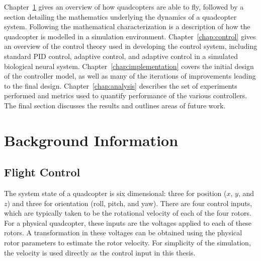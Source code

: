 \documentclass[letterpaper,12pt,titlepage,oneside,final]{book}
\newcommand{\Chapref}[1]{Chapter~\ref{#1}}
\begin{document}
\Chapref{chap:background} gives an overview of how quadcopters are able to fly, followed by a section detailing the mathematics underlying the dynamics of a quadcopter system. 
Following the mathematical characterization is a description of how the quadcopter is modelled in a simulation environment.
\Chapref{chap:control} gives an overview of the control theory used in developing the control system, including standard PID control, adaptive control, and adaptive control in a simulated biological neural system. 
\Chapref{chap:implementation} covers the initial design of the controller model, as well as many of the iterations of improvements leading to the final design.
\Chapref{chap:analysis} describes the set of experiments performed and metrics used to quantify performance of the various controllers. 
The final section discusses the results and outlines areas of future work.

\chapter{Background Information} \label{chap:background}

\section{Flight Control}


The system state of a quadcopter is six dimensional: three for position ($x$, $y$, and $z$) and three for orientation (roll, pitch, and yaw). 
There are four control inputs, which are typically taken to be the rotational velocity of each of the four rotors. 
For a physical quadcopter, these inputs are the voltages applied to each of these rotors.
A transformation in these voltages can be obtained using the physical rotor parameters to estimate the rotor velocity.
For simplicity of the simulation, the velocity is used directly as the control input in this thesis. 
\end{document}

